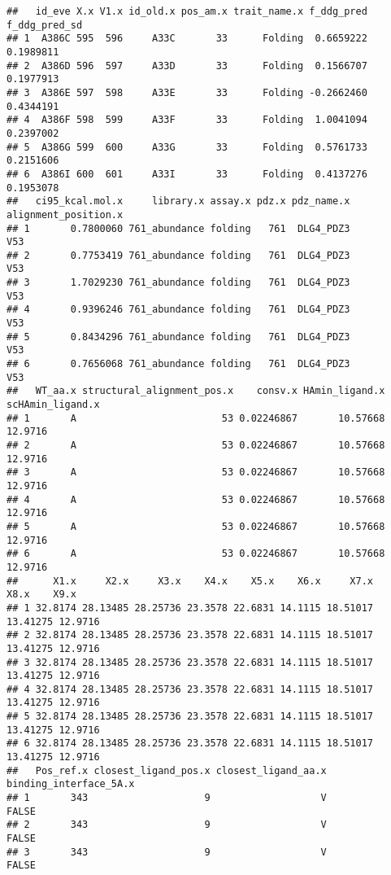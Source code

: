 \documentclass[
]{article}
\begin{document}
\begin{verbatim}
##   id_eve X.x V1.x id_old.x pos_am.x trait_name.x f_ddg_pred f_ddg_pred_sd
## 1  A386C 595  596     A33C       33      Folding  0.6659222     0.1989811
## 2  A386D 596  597     A33D       33      Folding  0.1566707     0.1977913
## 3  A386E 597  598     A33E       33      Folding -0.2662460     0.4344191
## 4  A386F 598  599     A33F       33      Folding  1.0041094     0.2397002
## 5  A386G 599  600     A33G       33      Folding  0.5761733     0.2151606
## 6  A386I 600  601     A33I       33      Folding  0.4137276     0.1953078
##   ci95_kcal.mol.x     library.x assay.x pdz.x pdz_name.x alignment_position.x
## 1       0.7800060 761_abundance folding   761  DLG4_PDZ3                  V53
## 2       0.7753419 761_abundance folding   761  DLG4_PDZ3                  V53
## 3       1.7029230 761_abundance folding   761  DLG4_PDZ3                  V53
## 4       0.9396246 761_abundance folding   761  DLG4_PDZ3                  V53
## 5       0.8434296 761_abundance folding   761  DLG4_PDZ3                  V53
## 6       0.7656068 761_abundance folding   761  DLG4_PDZ3                  V53
##   WT_aa.x structural_alignment_pos.x    consv.x HAmin_ligand.x scHAmin_ligand.x
## 1       A                         53 0.02246867       10.57668          12.9716
## 2       A                         53 0.02246867       10.57668          12.9716
## 3       A                         53 0.02246867       10.57668          12.9716
## 4       A                         53 0.02246867       10.57668          12.9716
## 5       A                         53 0.02246867       10.57668          12.9716
## 6       A                         53 0.02246867       10.57668          12.9716
##      X1.x     X2.x     X3.x    X4.x    X5.x    X6.x     X7.x     X8.x    X9.x
## 1 32.8174 28.13485 28.25736 23.3578 22.6831 14.1115 18.51017 13.41275 12.9716
## 2 32.8174 28.13485 28.25736 23.3578 22.6831 14.1115 18.51017 13.41275 12.9716
## 3 32.8174 28.13485 28.25736 23.3578 22.6831 14.1115 18.51017 13.41275 12.9716
## 4 32.8174 28.13485 28.25736 23.3578 22.6831 14.1115 18.51017 13.41275 12.9716
## 5 32.8174 28.13485 28.25736 23.3578 22.6831 14.1115 18.51017 13.41275 12.9716
## 6 32.8174 28.13485 28.25736 23.3578 22.6831 14.1115 18.51017 13.41275 12.9716
##   Pos_ref.x closest_ligand_pos.x closest_ligand_aa.x binding_interface_5A.x
## 1       343                    9                   V                  FALSE
## 2       343                    9                   V                  FALSE
## 3       343                    9                   V                  FALSE

\end{verbatim}
\end{document}
